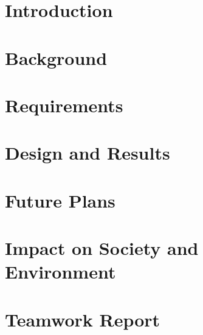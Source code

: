 \documentclass[11pt]{article}
\begin{document}
\section{Introduction}

\section{Background}

\section{Requirements}

\section{Design and Results}

\section{Future Plans}

\section{Impact on Society and Environment}

\section{Teamwork Report}

\end{document}
